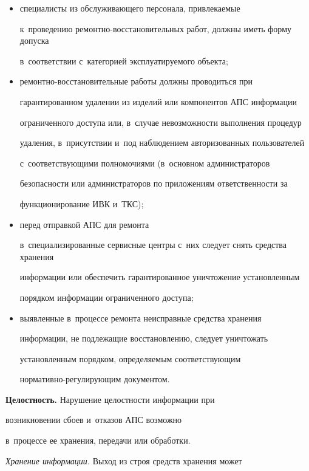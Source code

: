   \begin{itemize}

  \item специалисты из обслуживающего персонала, привлекаемые 

к~проведению ре\-монт\-но-вос\-ста\-но\-ви\-тель\-ных работ, должны иметь форму допуска 

в~соответствии с~категорией эксплуатируемого объекта;

  \item ремонтно-восстановительные работы должны проводиться при 

гарантированном удалении из изделий или компонентов АПС информации 

ограниченного доступа или, в~случае невозможности выполнения процедур 

удаления, в~присутствии и~под наблюдением авторизованных пользователей 

с~соответствующими полномочиями (в~основном администраторов  

без\-опас\-ности или администраторов по приложениям ответственности за 

функционирование ИВК и~ТКС);

\item перед отправкой АПС для ремонта 

в~специализированные сервисные центры с~них следует снять средства хранения 

информации или обеспечить гарантированное уничтожение установленным 

порядком информации ограниченного доступа;

  \item выявленные в~процессе ремонта неисправные средства хранения 

информации, не подлежащие восстановлению, следует уничтожать 

установленным порядком, определяемым соответствующим  

нор\-ма\-тив\-но-ре\-гу\-ли\-ру\-ющим документом. 

  \end{itemize}

  

\textbf{Целостность.} Нарушение целостности информации при 

возникновении сбоев и~отказов АПС возможно 

в~процессе ее хранения, передачи или обработки.

  

  \textit{Хранение информации.} Выход из строя средств хранения может 


